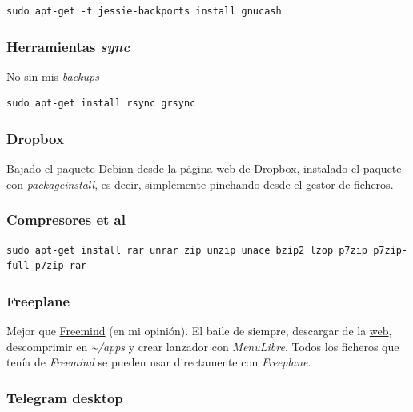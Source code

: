 \documentclass[12pt,spanish,]{scrartcl}
\begin{document}
\begin{verbatim}
sudo apt-get -t jessie-backports install gnucash
\end{verbatim}

\subsubsection{\texorpdfstring{Herramientas
\emph{sync}}{Herramientas sync}}\label{herramientas-sync}

No sin mis \emph{backups}

\begin{verbatim}
sudo apt-get install rsync grsync
\end{verbatim}

\subsubsection{Dropbox}\label{dropbox}

Bajado el paquete Debian desde la página
\href{https://www.dropbox.com/install-linux}{web de Dropbox}, instalado
el paquete con \emph{packageinstall}, es decir, simplemente pinchando
desde el gestor de ficheros.

\subsubsection{Compresores et al}\label{compresores-et-al}

\begin{verbatim}
sudo apt-get install rar unrar zip unzip unace bzip2 lzop p7zip p7zip-full p7zip-rar
\end{verbatim}

\subsubsection{Freeplane}\label{freeplane}

Mejor que
\href{http://freemind.sourceforge.net/wiki/index.php/Main_Page}{Freemind}
(en mi opinión). El baile de siempre, descargar de la
\href{http://www.freeplane.org/}{web}, descomprimir en
\emph{\textasciitilde{}/apps} y crear lanzador con \emph{MenuLibre}.
Todos los ficheros que tenía de \emph{Freemind} se pueden usar
directamente con \emph{Freeplane}.

\subsubsection{Telegram desktop}\label{telegram-desktop}
\end{document}
